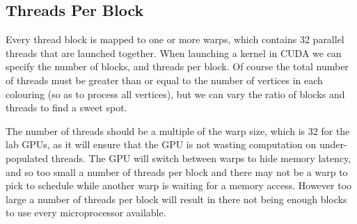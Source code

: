 \subsection*{Threads Per Block}
Every thread block is mapped to one or more warps, which contains 32 parallel threads that are launched together. When launching a kernel in CUDA we can specify the number of blocks, and threads per block. Of course the total number of threads must be greater than or equal to the number of vertices in each colouring (so as to process all vertices), but we can vary the ratio of blocks and threads to find a sweet spot.

The number of threads should be a multiple of the warp size, which is 32 for the lab GPUs, as it will ensure that the GPU is not wasting computation on under-populated threads. The GPU will switch between warps to hide memory latency\cite{threads_atomics}, and so too small a number of threads per block and there may not be a warp to pick to schedule while another warp is waiting for a memory access. However too large a number of threads per block will result in there not being enough blocks to use every microprocessor available.

